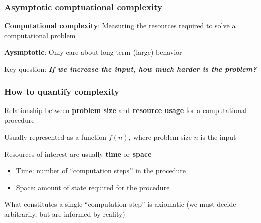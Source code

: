 \documentclass[aspectratio=169,hyperref={bookmarks=false,urlcolor=blue,colorlinks=true},10pt]{beamer}
\begin{document}
\begin{frame}
  \frametitle{Asymptotic comptuational complexity}

  \textbf{Computational complexity}: Measuring the resources required to solve a computational
  problem

  \vspace{\baselineskip}

  \pause
  \textbf{Aysmptotic}: Only care about long-term (large) behavior

  \vspace{2\baselineskip}

  \pause
  Key question: \textit{\textbf{\large If we increase the input, how much harder is the problem?}}
\end{frame}

\begin{frame}
  \frametitle{How to quantify complexity}

  Relationship between \textbf{problem size} and \textbf{resource usage} for a computational
  procedure

  \vspace{\baselineskip}

  \pause
  Usually represented as a function $f(n)$, where problem size $n$ is the input

  \vspace{\baselineskip}

  \pause
  Resources of interest are usually \textbf{time} or \textbf{space}
  \begin{itemize}
  \item Time: number of ``computation steps'' in the procedure
  \item Space: amount of state required for the procedure
  \end{itemize}

  \vspace{\baselineskip}

  \pause
  What constitutes a single ``computation step'' is axiomatic (we must decide arbitrarily, but are
  informed by reality)
\end{frame}
\end{document}
